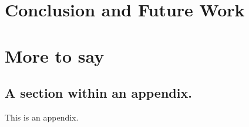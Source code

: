 \chapter{Conclusion and Future Work}


\appendix

\chapter{More to say}

\section{A section within an appendix.}
This is an appendix.




\singlespacing

%
%
%

